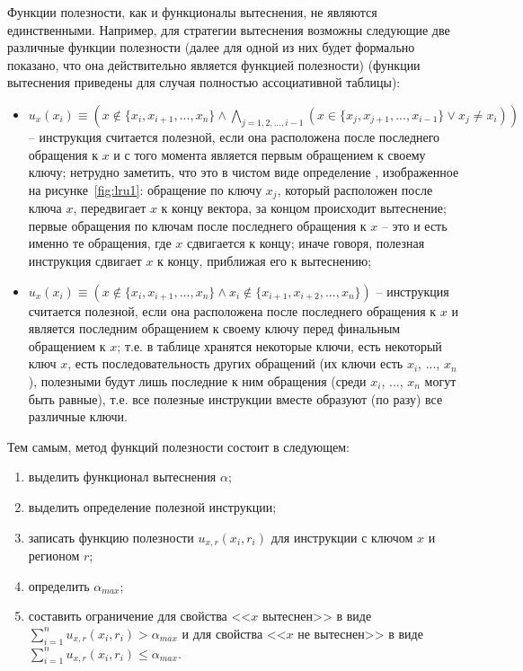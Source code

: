 Функции полезности, как и функционалы вытеснения, не являются единственными.
Например, для стратегии вытеснения \LRU возможны следующие две различные функции
полезности (далее для одной из них будет формально показано, что она
действительно является функцией полезности) (функции вытеснения приведены для
случая полностью ассоциативной таблицы):
\begin{itemize}
  \item $u_x(x_i) \equiv (x \notin \{x_i, x_{i+1}, ..., x_n\} \wedge
\bigwedge\limits_{j=1,2,...,i-1} (x \in \{x_j, x_{j+1}, ..., x_{i-1}\} \vee x_j
\neq x_i))$ -- инструкция считается полезной, если она расположена после
последнего обращения к $x$ и с того момента является первым обращением к своему
ключу; нетрудно заметить, что это в чистом виде определение \LRU, изображенное на рисунке~\ref{fig:lru1}: обращение по ключу $x_j$, который расположен после ключа $x$, передвигает $x$ к концу вектора, за концом происходит вытеснение; первые обращения по ключам после последнего обращения к $x$ -- это и есть именно те обращения, где $x$ сдвигается
к концу; иначе говоря, полезная инструкция сдвигает $x$ к концу, приближая его к
вытеснению;
  \item $u_x(x_i) \equiv (x \notin \{x_i, x_{i+1}, ..., x_n\} \wedge x_i \notin
\{x_{i+1}, x_{i+2}, ..., x_n\})$ -- инструкция считается полезной, если она
расположена после последнего обращения к $x$ и является последним обращением к
своему ключу перед финальным обращением к $x$; т.е. в таблице хранятся некоторые
ключи, есть некоторый ключ $x$, есть последовательность других обращений (их
ключи есть $x_i$, ..., $x_n$), полезными будут лишь последние к ним обращения
(среди $x_i$, ..., $x_n$ могут быть равные), т.е. все полезные инструкции вместе
образуют (по разу) все различные ключи.
\end{itemize}

Тем самым, метод функций полезности состоит в следующем:
\begin{enumerate}
  \item выделить функционал вытеснения $\alpha$;
  \item выделить определение полезной инструкции;
  \item записать функцию полезности $u_{x,r}(x_i, r_i)$ для инструкции с ключом
$x$ и регионом $r$;
  \item определить $\alpha_{max}$;
  \item составить ограничение для свойства <<$x$ вытеснен>> в виде
$\sum\limits_{i=1}^n u_{x,r}(x_i, r_i) > \alpha_{max}$ и для свойства <<$x$ не
вытеснен>> в виде $\sum\limits_{i=1}^n u_{x,r}(x_i,r_i) \leqslant \alpha_{max}$.
\end{enumerate}

